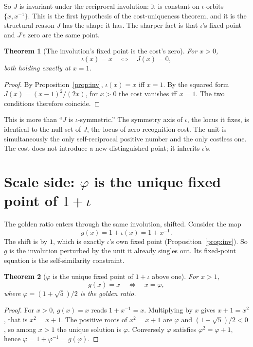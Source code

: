 \documentclass[11pt,a4paper]{article}
\newtheorem{theorem}{Theorem}[section]
\theoremstyle{definition}
\theoremstyle{remark}
\newcommand{\Jcost}{J}
\begin{document}
So $J$ is invariant under the reciprocal involution: it is constant on
$\iota$-orbits $\{x,x^{-1}\}$. This is the first hypothesis of the cost-uniqueness
theorem, and it is the structural reason $J$ has the shape it has. The sharper
fact is that $\iota$'s fixed point and $J$'s zero are the same point.

\begin{theorem}[The involution's fixed point is the cost's zero]\label{thm:fixed-zero}
For $x>0$,
\[
  \iota(x)=x \quad\Longleftrightarrow\quad \Jcost(x)=0,
\]
both holding exactly at $x=1$.
\end{theorem}

\begin{proof}
By Proposition~\ref{prop:inv}, $\iota(x)=x$ iff $x=1$. By the squared form
$\Jcost(x)=(x-1)^2/(2x)$, for $x>0$ the cost vanishes iff $x=1$. The two
conditions therefore coincide.
\end{proof}

This is more than ``$J$ is $\iota$-symmetric.'' The symmetry axis of $\iota$, the
locus it fixes, is identical to the null set of $J$, the locus of zero
recognition cost. The unit is simultaneously the only self-reciprocal positive
number and the only costless one. The cost does not introduce a new distinguished
point; it inherits $\iota$'s.

\section{Scale side: $\varphi$ is the unique fixed point of $1+\iota$}

The golden ratio enters through the same involution, shifted. Consider the map
\[
  g(x)=1+\iota(x)=1+x^{-1}.
\]
The shift is by $1$, which is exactly $\iota$'s own fixed point
(Proposition~\ref{prop:inv}). So $g$ is the involution perturbed by the unit it
already singles out. Its fixed-point equation is the self-similarity constraint.

\begin{theorem}[$\varphi$ is the unique fixed point of $1+\iota$ above one]\label{thm:phi}
For $x>1$,
\[
  g(x)=x \quad\Longleftrightarrow\quad x=\varphi,
\]
where $\varphi=(1+\sqrt5)/2$ is the golden ratio.
\end{theorem}

\begin{proof}
For $x>0$, $g(x)=x$ reads $1+x^{-1}=x$. Multiplying by $x$ gives $x+1=x^2$, that
is $x^2=x+1$. The positive roots of $x^2=x+1$ are $\varphi$ and $(1-\sqrt5)/2<0$,
so among $x>1$ the unique solution is $\varphi$. Conversely $\varphi$ satisfies
$\varphi^2=\varphi+1$, hence $\varphi=1+\varphi^{-1}=g(\varphi)$.
\end{proof}
\end{document}
